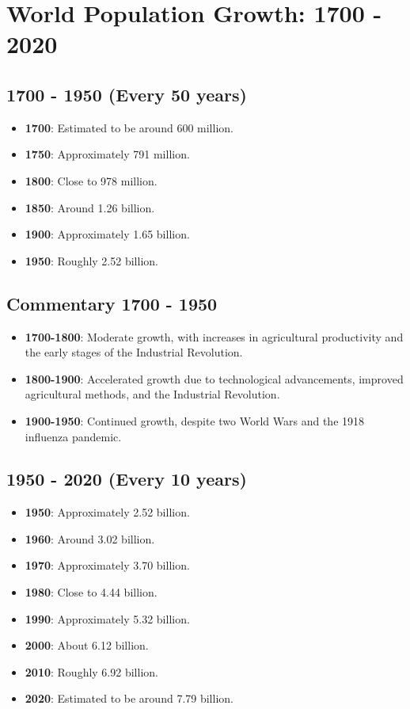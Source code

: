 \section{World Population Growth: 1700 - 2020}

\subsection*{1700 - 1950 (Every 50 years)}
\begin{itemize}
    \item \textbf{1700}: Estimated to be around 600 million.
    \item \textbf{1750}: Approximately 791 million.
    \item \textbf{1800}: Close to 978 million.
    \item \textbf{1850}: Around 1.26 billion.
    \item \textbf{1900}: Approximately 1.65 billion.
    \item \textbf{1950}: Roughly 2.52 billion.
\end{itemize}

\subsection*{Commentary 1700 - 1950}
\begin{itemize}
    \item \textbf{1700-1800}: Moderate growth, with increases in agricultural productivity and the early stages of the Industrial Revolution.
    \item \textbf{1800-1900}: Accelerated growth due to technological advancements, improved agricultural methods, and the Industrial Revolution.
    \item \textbf{1900-1950}: Continued growth, despite two World Wars and the 1918 influenza pandemic.
\end{itemize}

\subsection*{1950 - 2020 (Every 10 years)}
\begin{itemize}
    \item \textbf{1950}: Approximately 2.52 billion.
    \item \textbf{1960}: Around 3.02 billion.
    \item \textbf{1970}: Approximately 3.70 billion.
    \item \textbf{1980}: Close to 4.44 billion.
    \item \textbf{1990}: Approximately 5.32 billion.
    \item \textbf{2000}: About 6.12 billion.
    \item \textbf{2010}: Roughly 6.92 billion.
    \item \textbf{2020}: Estimated to be around 7.79 billion.
\end{itemize}

